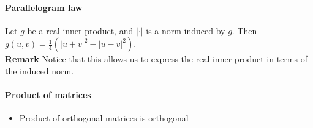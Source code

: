 \documentclass{article}
\begin{document}
\paragraph{Parallelogram law} Let $g$ be a real inner product, and $|\cdot|$ is a norm induced by $g$. Then $g(u,v) = \frac{1}{4}(|u+v|^2-|u-v|^2)$.\\
\textbf{Remark} Notice that this allows us to express the real inner product in terms of the induced norm.

\paragraph{Product of matrices}
\begin{itemize}
	\item Product of orthogonal matrices is orthogonal
\end{itemize}
\end{document}
